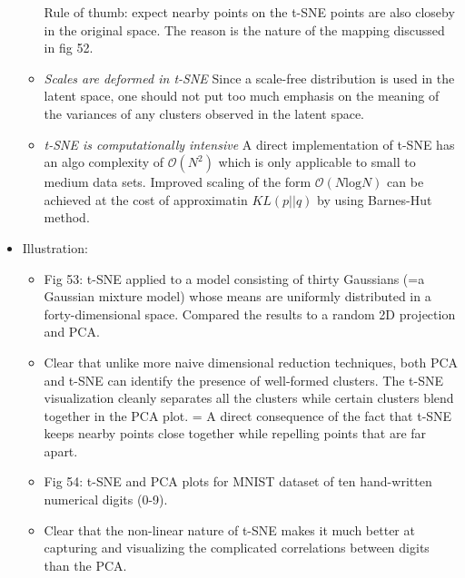 \documentclass[norsk,a4paper,11pt]{article}
\begin{document}
\begin{itemize}
\begin{itemize}
		Rule of thumb: expect nearby points on the t-SNE points are also closeby in the original space. The reason is the nature of the mapping discussed in fig 52.
		\item \textit{Scales are deformed in t-SNE}
		Since a scale-free distribution is used in the latent space, one should not put too much emphasis on the meaning of the variances of any clusters observed in the latent space.
		\item \textit{t-SNE is computationally intensive}
		A direct implementation of t-SNE has an algo complexity of $\mathcal{O}(N^2)$ which is only applicable to small to medium data sets.
		Improved scaling of the form $\mathcal{O}(N\text{log}N)$ can be achieved at the cost of approximatin $KL(p||q)$ by using Barnes-Hut method.
	\end{itemize}
	\item Illustration:
	\begin{itemize}
		\item Fig 53: t-SNE applied to a model consisting of thirty Gaussians (=a Gaussian mixture model) whose means are uniformly distributed in a forty-dimensional space. Compared the results to a random 2D projection and PCA. 
		\item Clear that unlike more naive dimensional reduction techniques, both PCA and t-SNE can identify the presence of well-formed clusters. The t-SNE visualization cleanly separates all the clusters while certain clusters blend together in the PCA plot. = A direct consequence of the fact that t-SNE keeps nearby points close together while repelling points that are far apart.
		\item Fig 54: t-SNE and PCA plots for MNIST dataset of ten hand-written numerical digits (0-9).
		\item Clear that the non-linear nature of t-SNE makes it much better at capturing and visualizing the complicated correlations between digits than the PCA.
	\end{itemize}
\end{itemize}
\end{document}
